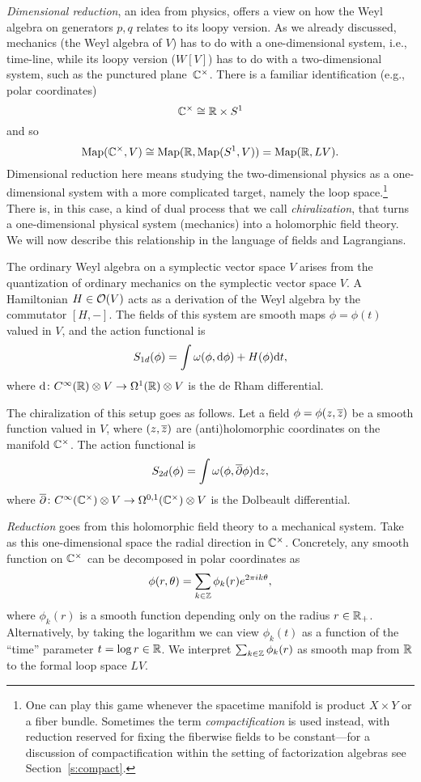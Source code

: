 \documentclass[11pt]{amsart}
\begin{document}
{\it Dimensional reduction}, an idea from physics, offers a view on how the Weyl algebra on generators $p, q$ relates to its loopy version.
As we already discussed, mechanics (the Weyl algebra of $V$) has to do with a one-dimensional system, i.e., time-line, 
while its loopy version ($W[V]$) has to do with a two-dimensional system, such as the punctured plane~$\mathbb C^\times$.
There is a familiar identification (e.g., polar coordinates)
\[
\mathbb C^\times \cong \mathbb R \times S^1
\]
and so
\[
{\rm Map}(\mathbb C^\times,V) \cong {\rm Map}(\mathbb R, {\rm Map}(S^1,V)) = {\rm Map}(\mathbb R, LV).
\]
Dimensional reduction here means studying the two-dimensional physics as a one-dimensional system with a more complicated target, namely the loop space.\footnote{One can play this game whenever the spacetime manifold is product $X \times Y$ or a fiber bundle.
Sometimes the term {\it compactification} is used instead, with reduction reserved for fixing the fiberwise fields to be constant---for a discussion of compactification within the setting of factorization algebras see Section~\ref{s:compact}.}
There is, in this case, a kind of dual process that we call {\it chiralization},
that turns a one-dimensional physical system (mechanics) into a holomorphic field theory.
We will now describe this relationship in the language of fields and Lagrangians.

The ordinary Weyl algebra on a symplectic vector space $V$ arises from the quantization of ordinary mechanics on the symplectic vector space $V$.
A Hamiltonian $H \in \mathcal O(V)$ acts as a derivation of the Weyl algebra by the commutator $[H,-]$.
The fields of this system are smooth maps $\phi = \phi(t)$ valued in $V$, 
and the action functional is 
\[
S_{1d} (\phi) = \int \omega(\phi , {\rm d} \phi) + H(\phi) {\rm d} t ,
\]
where ${\rm d} \colon C^\infty(\mathbb R) \otimes V \to \Omega^1(\mathbb R) \otimes V$ is the de Rham differential. 

The chiralization of this setup goes as follows.
Let a field $\phi = \phi(z,{\overline{z}})$ be a smooth function valued in $V$, 
where $(z,{\overline{z}})$ are (anti)holomorphic coordinates on the manifold $\mathbb C^\times$.
The action functional is 
\[
S_{2d}(\phi) = \int \omega(\phi, {\overline{\partial}} \phi) {\rm d} z ,
\]
where ${\overline{\partial}} \colon C^\infty(\mathbb C^\times)\otimes V \to \Omega^{0,1}(\mathbb C^\times) \otimes V$ is the Dolbeault differential.

{\it Reduction} goes from this holomorphic field theory to a mechanical system. 
Take as this one-dimensional space the radial direction in $\mathbb C^\times$.
Concretely, any smooth function on $\mathbb C^\times$ can be decomposed in polar coordinates as
\[
\phi(r,\theta) = \sum_{k \in \mathbb Z} \phi_k(r) e^{2 \pi i k \theta} ,
\]
where $\phi_k(r)$ is a smooth function depending only on the radius $r \in \mathbb R_+$.
Alternatively, by taking the logarithm we can view $\phi_k(t)$ as a function of the ``time'' parameter $t = \log r \in \mathbb R$. 
We interpret $\sum_{k \in \mathbb Z} \phi_k(r)$ as smooth map from $\mathbb R$ to the formal loop space $LV$. 
\end{document}
